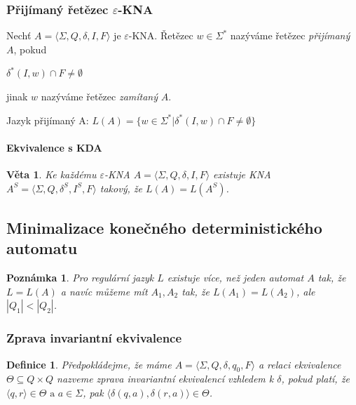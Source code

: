 \documentclass[10pt,a4paper]{article}
\theoremstyle{note}
\newtheorem{veta}{Věta}
\newtheorem{definice}{Definice}
\newtheorem{poznamka}{Poznámka}
\begin{document}
\subsubsection{Přijímaný řetězec $\varepsilon$-KNA}

Nechť $A=\langle\Sigma,Q,\delta,I,F\rangle$ je $\varepsilon$-KNA. Řetězec $w \in \Sigma^*$ nazýváme řetězec \textit{přijímaný} $A$, pokud

$\delta^*(I,w) \cap F \neq \emptyset$

jinak $w$ nazýváme řetězec \textit{zamítaný} $A$.

Jazyk přijímaný A: $L(A) = \lbrace w \in \Sigma^{*} | \delta^{*}(I, w) \cap F \neq \emptyset \rbrace$ 
\paragraph{Ekvivalence s KDA}

\begin{veta}
Ke každému $\varepsilon$-KNA  $A=\langle\Sigma,Q,\delta,I,F\rangle$ existuje KNA $A^S=\langle\Sigma,Q,\delta^S,I^S,F\rangle$ takový, že $L(A)=L(A^S)$.
\end{veta}
 



	\subsection{Minimalizace konečného deterministického automatu}


\begin{poznamka}
Pro regulární jazyk $L$ existuje více, než jeden automat $A$ tak, že $L = L(A)$ a navíc můžeme mít $A_{1}, A_{2}$ tak, že
$L(A_{1}) = L(A_{2})$, ale $|Q_{1}| < |Q_{2}|$.
\end{poznamka}

\subsubsection{Zprava invariantní ekvivalence}

\begin{definice}
Předpokládejme, že máme $A = \langle \Sigma, Q, \delta, q_{0}, F \rangle$ a relaci ekvivalence $\Theta \subseteq Q \times Q$ nazveme
\textit{zprava invariantní ekvivalencí} vzhledem k $\delta$, pokud platí, že $\langle q,r  \rangle \in \Theta \text{ a } a \in \Sigma$,
pak $\langle  \delta(q, a), \delta(r, a) \rangle \in \Theta$.
\end{definice}
\end{document}
